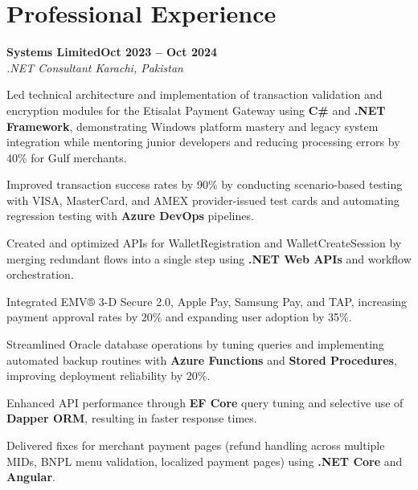 \documentclass[letterpaper,10pt]{article}
\newcommand{\headingBf}[2]{
  \hspace{10pt}\textbf{#1}\hfill\textbf{#2}\\
}
\newcommand{\headingIt}[2]{
  \hspace{10pt}\textit{#1}\hfill\textit{#2}\\
}
\newenvironment{resume_list}{
  \vspace{-7pt}
  \begin{itemize}[itemsep=-2px, parsep=1pt, leftmargin=30pt]
}{
  \end{itemize}
}
\begin{document}
\section{Professional Experience}

\headingBf{Systems Limited}{Oct 2023 -- Oct 2024}
\headingIt{.NET Consultant \hfill Karachi, Pakistan}{}
\begin{resume_list}
    \item Led technical architecture and implementation of transaction validation and encryption modules for the Etisalat Payment Gateway using \textbf{C\#} and \textbf{.NET Framework}, demonstrating Windows platform mastery and legacy system integration while mentoring junior developers and reducing processing errors by 40\% for Gulf merchants.
    \item Improved transaction success rates by 90\% by conducting scenario-based testing with VISA, MasterCard, and AMEX provider-issued test cards and automating regression testing with \textbf{Azure DevOps} pipelines.
    \item Created and optimized APIs for WalletRegistration and WalletCreateSession by merging redundant flows into a single step using \textbf{.NET Web APIs} and workflow orchestration.
    \item Integrated EMV® 3-D Secure 2.0, Apple Pay, Samsung Pay, and TAP, increasing payment approval rates by 20\% and expanding user adoption by 35\%.
    \item Streamlined Oracle database operations by tuning queries and implementing automated backup routines with \textbf{Azure Functions} and \textbf{Stored Procedures}, improving deployment reliability by 20\%.
    \item Enhanced API performance through \textbf{EF Core} query tuning and selective use of \textbf{Dapper ORM}, resulting in faster response times.
    \item Delivered fixes for merchant payment pages (refund handling across multiple MIDs, BNPL menu validation, localized payment pages) using \textbf{.NET Core} and \textbf{Angular}.
\end{resume_list}
\end{document}
